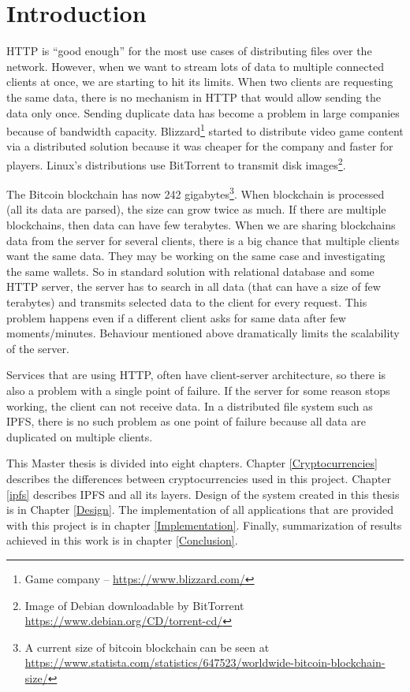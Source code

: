 \chapter{Introduction}


HTTP is ``good enough'' for the most use cases of distributing files over the network. However, when we want to stream lots of data to multiple connected clients at once, we are starting to hit its limits. When two clients are requesting the same data, there is no mechanism in HTTP that would allow sending the data only once. Sending duplicate data has become a problem in large companies because of bandwidth capacity. Blizzard\footnote{Game company -- \url{https://www.blizzard.com/}} started to distribute video game content via a distributed solution because it was cheaper for the company and faster for players\cite{BigDataInVideoGames}. Linux's distributions use BitTorrent to transmit disk images\footnote{Image of Debian downloadable by BitTorrent \url{https://www.debian.org/CD/torrent-cd/}}.

The Bitcoin blockchain has now 242 gigabytes\footnote{A current size of bitcoin blockchain can be seen at \url{https://www.statista.com/statistics/647523/worldwide-bitcoin-blockchain-size/}}. When blockchain is processed (all its data are parsed), the size can grow twice as much. If there are multiple blockchains, then data can have few terabytes. When we are sharing blockchains data from the server for several clients, there is a big chance that multiple clients want the same data. They may be working on the same case and investigating the same wallets. So in standard solution with relational database and some HTTP server, the server has to search in all data (that can have a size of few terabytes) and transmits selected data to the client for every request. This problem happens even if a different client asks for same data after few moments/minutes. Behaviour mentioned above dramatically limits the scalability of the server.

Services that are using HTTP, often have client-server architecture, so there is also a problem with a single point of failure. If the server for some reason stops working, the client can not receive data. In a distributed file system such as IPFS, there is no such problem as one point of failure because all data are duplicated on multiple clients.

This Master thesis is divided into eight chapters. Chapter \ref{Cryptocurrencies} describes the differences between cryptocurrencies used in this project. Chapter \ref{ipfs} describes IPFS and all its layers. Design of the system created in this thesis is in Chapter \ref{Design}. The implementation of all applications that are provided with this project is in chapter \ref{Implementation}. Finally, summarization of results achieved in this work is in chapter \ref{Conclusion}.
